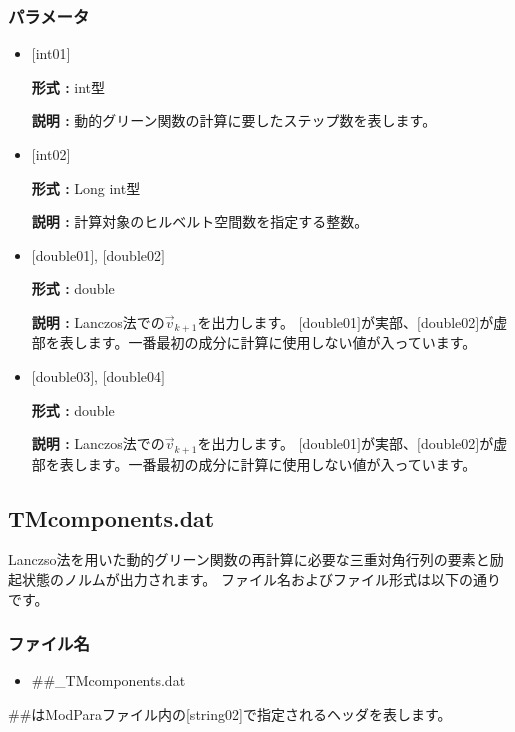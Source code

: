 \subsubsection{パラメータ}
 \begin{itemize}

  \item  $[$int01$]$

 {\bf 形式 :} int型

 {\bf 説明 :} 動的グリーン関数の計算に要したステップ数を表します。

  \item  $[$int02$]$

 {\bf 形式 :} Long int型

{\bf 説明 :} 計算対象のヒルベルト空間数を指定する整数。

  \item  $[$double01$]$, $[$double02$]$ 

 {\bf 形式 :} double 

{\bf 説明 :}  Lanczos法での$\vec{v}_{k+1}$を出力します。 $[$double01$]$が実部、$[$double02$]$が虚部を表します。一番最初の成分に計算に使用しない値が入っています。\\

 \item  $[$double03$]$, $[$double04$]$ 

 {\bf 形式 :} double 

{\bf 説明 :}  Lanczos法での$\vec{v}_{k+1}$を出力します。 $[$double01$]$が実部、$[$double02$]$が虚部を表します。一番最初の成分に計算に使用しない値が入っています。\\
 
\end{itemize}

\newpage
\subsection{{TMcomponents.dat}}
Lanczso法を用いた動的グリーン関数の再計算に必要な三重対角行列の要素と励起状態のノルムが出力されます。
ファイル名およびファイル形式は以下の通りです。

\subsubsection{ファイル名}
\begin{itemize}
   \item{\#\#\_TMcomponents.dat}
\end{itemize}
  \#\#はModParaファイル内の[string02]で指定されるヘッダを表します。


